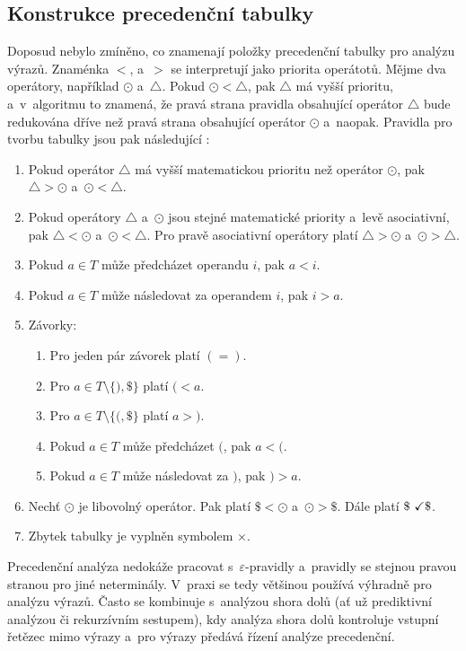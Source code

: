 \subsection*{Konstrukce precedenční tabulky}
Doposud nebylo zmíněno, co znamenají položky precedenční tabulky pro analýzu výrazů.
Znaménka $<$, a~$>$ se interpretují jako priorita operátotů.
Mějme dva operátory, například $\odot$ a~$\bigtriangleup$.
Pokud $\odot < \bigtriangleup$, pak $\bigtriangleup$ má vyšší prioritu, a~v~algoritmu to znamená, že pravá strana pravidla obsahující operátor $\bigtriangleup$ bude redukována dříve než pravá strana obsahující operátor $\odot$ a~naopak.
Pravidla pro tvorbu tabulky jsou pak následující \cite{medunaElementsOfCompDesign,meduna2017sa-zdola-nahoru}:
\begin{enumerate}
    \item Pokud operátor $\bigtriangleup$ má vyšší matematickou prioritu než operátor $\odot$, pak $\bigtriangleup > \odot$ a~$\odot < \bigtriangleup$.
    \item Pokud operátory $\bigtriangleup$ a~$\odot$ jsou stejné matematické priority a~levě asociativní, pak $\bigtriangleup < \odot$ a~$\odot < \bigtriangleup$.
    Pro pravě asociativní operátory platí $\bigtriangleup > \odot$ a~$\odot > \bigtriangleup$.
    \item Pokud $a \in T$ může předcházet operandu $i$, pak $a < i$.
    \item Pokud $a \in T$ může následovat za operandem $i$, pak $i > a$.
    \item Závorky:
    \begin{enumerate}
        \item Pro jeden pár závorek platí $(=)$.
        \item Pro $a \in T \setminus \{) ,\$\}$ platí $( < a$.
        \item Pro $a \in T \setminus\{(, \$\}$ platí $a > )$.
        \item Pokud $a \in T$ může předcházet $($, pak $a < ($. 
        \item Pokud $a \in T$ může následovat za $)$, pak $) > a$.
    \end{enumerate}
    \item Nechť $\odot$ je libovolný operátor.
    Pak platí $\$ < \odot$ a~$\odot > \$$.
    Dále platí $\$ \text{ \checkmark } \$$.
    \item Zbytek tabulky je vyplněn symbolem $\times$.
\end{enumerate}

Precedenční analýza nedokáže pracovat s~$\varepsilon$-pravidly a~pravidly se stejnou pravou stranou pro jiné neterminály.
V~praxi se tedy většinou používá výhradně pro analýzu výrazů.
Často se kombinuje s~analýzou shora dolů (ať už prediktivní analýzou či rekurzívním sestupem), kdy analýza shora dolů kontroluje vstupní řetězec mimo výrazy a~pro výrazy předává řízení analýze precedenční.

